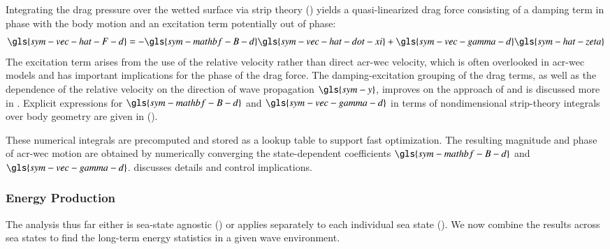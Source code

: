 Integrating the drag pressure over the wetted surface via strip theory () yields a quasi-linearized drag force consisting of a damping term in phase with the body motion and an excitation term potentially out of phase:
\begin{equation}\label{eq:drag-damping-excitation}
    \gls{sym-vec-hat-F-d} = -\gls{sym-mathbf-B-d} \gls{sym-vec-hat-dot-xi}
    + \gls{sym-vec-gamma-d} \gls{sym-hat-zeta}
\end{equation}
The excitation term arises from the use of the relative velocity rather than direct \gls{acr-wec} velocity, which is often overlooked in \gls{acr-wec} models and has important implications for the phase of the drag force.
The damping-excitation grouping of the drag terms, as well as the dependence of the relative velocity on the direction of wave propagation $\gls{sym-y}$, improves on the approach of \citet{quartier_influence_2021} and is discussed more in .
Explicit expressions for $\gls{sym-mathbf-B-d}$ and $\gls{sym-vec-gamma-d}$ in terms of nondimensional strip-theory integrals over body geometry are given in  ().

These numerical integrals are precomputed and stored as a lookup table to support fast optimization.
The resulting magnitude and phase of \gls{acr-wec} motion are obtained by numerically converging the state-dependent coefficients $\gls{sym-mathbf-B-d}$ and $\gls{sym-vec-gamma-d}$.
 discusses details and control implications.


\subsubsection{Energy Production}
The analysis thus far either is sea-state agnostic () or applies separately to each individual sea state ().
We now combine the results across sea states to find the long-term energy statistics in a given wave environment.

